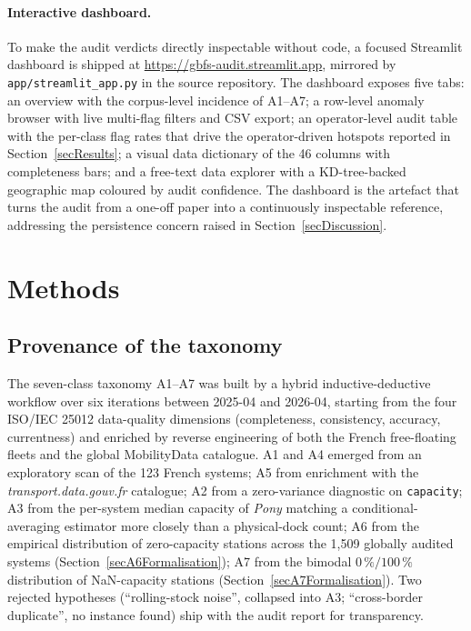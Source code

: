 \documentclass[11pt,a4paper]{article}
\begin{document}
\paragraph{Interactive dashboard.}
To make the audit verdicts directly inspectable without code, a
focused Streamlit dashboard is shipped at
\url{https://gbfs-audit.streamlit.app}, mirrored by
\texttt{app/streamlit\_app.py} in the source repository. The
dashboard exposes five tabs: an overview with the corpus-level
incidence of A1--A7; a row-level anomaly browser with live
multi-flag filters and CSV export; an operator-level audit table
with the per-class flag rates that drive the operator-driven
hotspots reported in Section~\ref{secResults}; a visual data
dictionary of the 46 columns with completeness bars; and a
free-text data explorer with a KD-tree-backed geographic map
coloured by audit confidence. The dashboard is the artefact that
turns the audit from a one-off paper into a continuously
inspectable reference, addressing the persistence concern raised
in Section~\ref{secDiscussion}.

\section{Methods}\label{secMethods}

\subsection{Provenance of the taxonomy}
The seven-class taxonomy A1--A7 was built by a hybrid
inductive-deductive workflow over six iterations between 2025-04
and 2026-04, starting from the four ISO/IEC 25012 data-quality
dimensions (completeness, consistency, accuracy, currentness)
and enriched by reverse engineering of both the French
free-floating fleets and the global MobilityData catalogue.
A1 and A4 emerged from an exploratory scan of the 123 French
systems; A5 from enrichment with the
\emph{transport.data.gouv.fr} catalogue; A2 from a zero-variance
diagnostic on \texttt{capacity}; A3 from the per-system median
capacity of \emph{Pony} matching a conditional-averaging
estimator more closely than a physical-dock count; A6 from the
empirical distribution of zero-capacity stations across the
1{,}509 globally audited systems
(Section~\ref{secA6Formalisation}); A7 from the bimodal
$0\,\%/100\,\%$ distribution of NaN-capacity stations
(Section~\ref{secA7Formalisation}). Two rejected hypotheses
(``rolling-stock noise'', collapsed into A3; ``cross-border
duplicate'', no instance found) ship with the audit report
for transparency.
\end{document}
